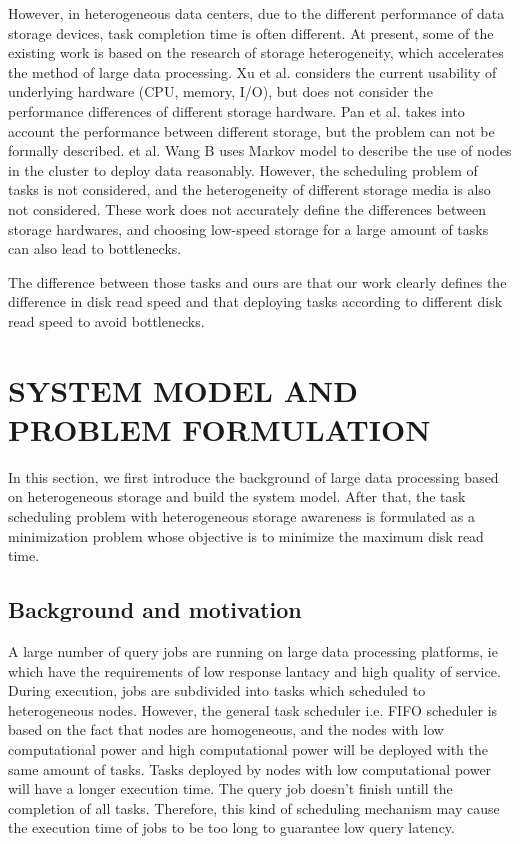 \documentclass[conference]{IEEEtran}
\begin{document}
However, in heterogeneous data centers, due to the different performance of data storage devices, task completion time is often different. At present, some of the existing work is based on the research of storage heterogeneity, which accelerates the method of large data processing. Xu et al. \cite{b6} considers the current usability of underlying hardware (CPU, memory, I/O), but does not consider the performance differences of different storage hardware. Pan et al. \cite{b7} takes into account the performance between different storage, but the problem can not be formally described. et al. Wang B \cite{b8} uses Markov model to describe the use of nodes in the cluster to deploy data reasonably. However, the scheduling problem of tasks is not considered, and the heterogeneity of different storage media is also not considered. These work does not accurately define the differences between storage hardwares, and choosing low-speed storage for a large amount of tasks can also lead to bottlenecks.

The difference between those tasks and ours are that our work clearly defines the difference in disk read speed and that deploying tasks according to different disk read speed to avoid bottlenecks.

\section{SYSTEM MODEL AND PROBLEM FORMULATION}
In this section, we first introduce the background of large data processing based on heterogeneous storage and build the system model. After that, the task scheduling problem with heterogeneous storage awareness is formulated as a  minimization problem whose objective is to minimize the maximum disk read time.

\subsection{Background and motivation}\label{AA}

A large number of query jobs are running on large data processing platforms, ie which have the requirements of low response lantacy and high quality of service. During execution, jobs are subdivided into tasks which scheduled to heterogeneous nodes. However, the general task scheduler i.e. FIFO scheduler is based on the fact that nodes are homogeneous, and the nodes with low computational power and high computational power will be deployed with the same amount of tasks. Tasks deployed by nodes with low computational power will have a longer execution time. The query job doesn't finish untill the completion of all tasks. Therefore, this kind of scheduling mechanism may cause the execution time of jobs to be too long to guarantee low query latency.
\end{document}
